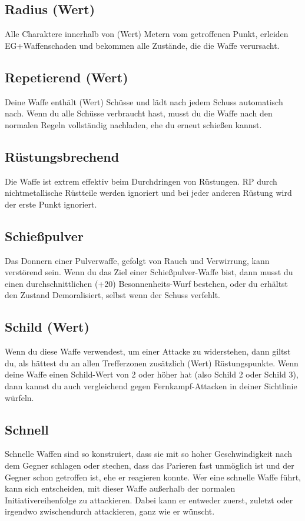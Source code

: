 \documentclass[a4paper, fontsize=9pt twocolumn]{scrartcl}
\begin{document}
\begin{multicols*}{2}
    \subsection{Radius (Wert)}
    Alle Charaktere innerhalb von (Wert) Metern vom getroffenen Punkt, erleiden EG+Waffenschaden und bekommen alle Zustände, die die Waffe verursacht.

    \subsection{Repetierend (Wert)}
    Deine Waffe enthält (Wert) Schüsse und lädt nach jedem Schuss automatisch nach.
    Wenn du alle Schüsse verbraucht hast, musst du die Waffe nach den normalen Regeln vollständig nachladen, ehe du erneut schießen kannst.

    \subsection{Rüstungsbrechend}
    Die Waffe ist extrem effektiv beim Durchdringen von Rüstungen.
    RP durch nichtmetallische Rüstteile werden ignoriert und bei jeder anderen Rüstung wird der erste Punkt ignoriert.

    \subsection{Schießpulver}
    Das Donnern einer Pulverwaffe, gefolgt von Rauch und Verwirrung, kann verstörend sein.
    Wenn du das Ziel einer Schießpulver-Waffe bist, dann musst du einen durchschnittlichen (+20) Besonnenheits-Wurf bestehen, oder du erhältst den Zustand Demoralisiert, selbst wenn der Schuss verfehlt.

    \subsection{Schild (Wert)}
    Wenn du diese Waffe verwendest, um einer Attacke zu widerstehen, dann giltst du, als hättest du an allen Trefferzonen zusätzlich (Wert) Rüstungspunkte.
    Wenn deine Waffe einen Schild-Wert von 2 oder höher hat (also Schild 2 oder Schild 3), dann kannst du auch vergleichend gegen Fernkampf-Attacken in deiner Sichtlinie würfeln.

    \subsection{Schnell}
    Schnelle Waffen sind so konstruiert, dass sie mit so hoher Geschwindigkeit nach dem Gegner schlagen oder stechen, dass das Parieren fast unmöglich ist und der Gegner schon getroffen ist, ehe er reagieren konnte.
    Wer eine schnelle Waffe führt, kann sich entscheiden, mit dieser Waffe außerhalb der normalen Initiativereihenfolge zu attackieren.
    Dabei kann er entweder zuerst, zuletzt oder irgendwo zwischendurch attackieren, ganz wie er wünscht.\newline


\end{multicols*}
\end{document}
